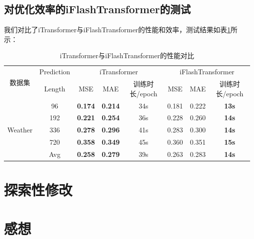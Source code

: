 \documentclass[twoside,12pt]{article}
\begin{document}
\subsection{对优化效率的iFlashTransformer的测试}
我们对比了iTransformer与iFlashTransformer的性能和效率，测试结果如表\ref{tab:itransformer_vs_iflashtransformer}所示：
\begin{table}[htbp]
  \caption{\small{iTransformer与iFlashTransformer的性能对比}}
  \label{tab:itransformer_vs_iflashtransformer}
  \vspace{5pt}
  \centering
  \begin{tabular}{c|c|ccc|ccc}
    \toprule
    \multirow{2}{*}{数据集}  & Prediction & \multicolumn{3}{c|}{iTransformer} & \multicolumn{3}{c}{iFlashTransformer}                                                   \\
    \cmidrule(lr){3-4} \cmidrule(lr){5-6}
                             & Length     & MSE                               & MAE                                   & 训练时长/epoch & MSE   & MAE   & 训练时长/epoch \\
    \midrule
    \multirow{5}{*}{Weather} & 96         & \textbf{0.174}                    & \textbf{0.214}                        & 34s            & 0.181 & 0.222 & \textbf{13s}   \\
                             & 192        & \textbf{0.221}                    & \textbf{0.254}                        & 36s            & 0.228 & 0.260 & \textbf{14s}   \\
                             & 336        & \textbf{0.278}                    & \textbf{0.296}                        & 41s            & 0.283 & 0.300 & \textbf{14s}   \\
                             & 720        & \textbf{0.358}                    & \textbf{0.349}                        & 45s            & 0.360 & 0.351 & \textbf{15s}   \\
    \cmidrule(lr){2-6}
                             & Avg        & \textbf{0.258}                    & \textbf{0.279}                        & 39s            & 0.263 & 0.283 & \textbf{14s}   \\
    \bottomrule
    \bottomrule
  \end{tabular}
\end{table}


\section{探索性修改}


\section{感想}






\vfill
\end{document}
